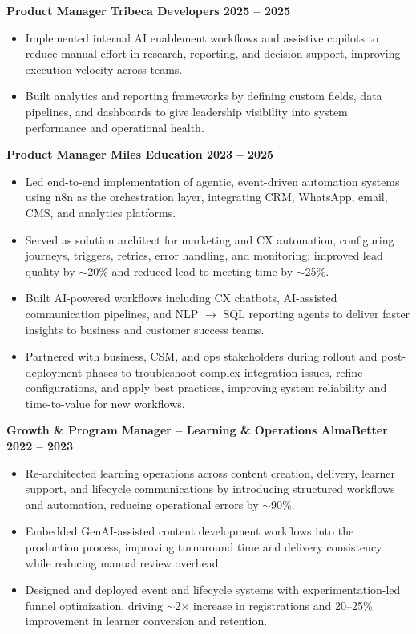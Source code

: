 \documentclass[10pt,a4paper]{article}
\begin{document}
\textbf{Product Manager \textbar{} Tribeca Developers \textbar{} 2025 -- 2025}
\begin{itemize}[leftmargin=*, nosep]
  \item Implemented internal AI enablement workflows and assistive copilots to reduce manual effort in research, reporting, and decision support, improving execution velocity across teams.
  \item Built analytics and reporting frameworks by defining custom fields, data pipelines, and dashboards to give leadership visibility into system performance and operational health.
\end{itemize}

\textbf{Product Manager \textbar{} Miles Education \textbar{} 2023 -- 2025}
\begin{itemize}[leftmargin=*, nosep]
  \item Led end-to-end implementation of agentic, event-driven automation systems using n8n as the orchestration layer, integrating CRM, WhatsApp, email, CMS, and analytics platforms.
  \item Served as solution architect for marketing and CX automation, configuring journeys, triggers, retries, error handling, and monitoring; improved lead quality by $\sim$20\% and reduced lead-to-meeting time by $\sim$25\%.
  \item Built AI-powered workflows including CX chatbots, AI-assisted communication pipelines, and NLP $\rightarrow$ SQL reporting agents to deliver faster insights to business and customer success teams.
  \item Partnered with business, CSM, and ops stakeholders during rollout and post-deployment phases to troubleshoot complex integration issues, refine configurations, and apply best practices, improving system reliability and time-to-value for new workflows.
\end{itemize}

\textbf{Growth \& Program Manager -- Learning \& Operations \textbar{} AlmaBetter \textbar{} 2022 -- 2023}
\begin{itemize}[leftmargin=*, nosep]
  \item Re-architected learning operations across content creation, delivery, learner support, and lifecycle communications by introducing structured workflows and automation, reducing operational errors by $\sim$90\%.
  \item Embedded GenAI-assisted content development workflows into the production process, improving turnaround time and delivery consistency while reducing manual review overhead.
  \item Designed and deployed event and lifecycle systems with experimentation-led funnel optimization, driving $\sim$2$\times$ increase in registrations and 20--25\% improvement in learner conversion and retention.
\end{itemize}
\end{document}
